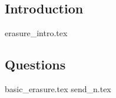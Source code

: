 \documentclass{exam}
\begin{document}
\subsection{Introduction}
{erasure_intro.tex}
\subsection{Questions}
\begin{questions}
{basic_erasure.tex}
{send_n.tex}
\end{questions}
\end{document}
